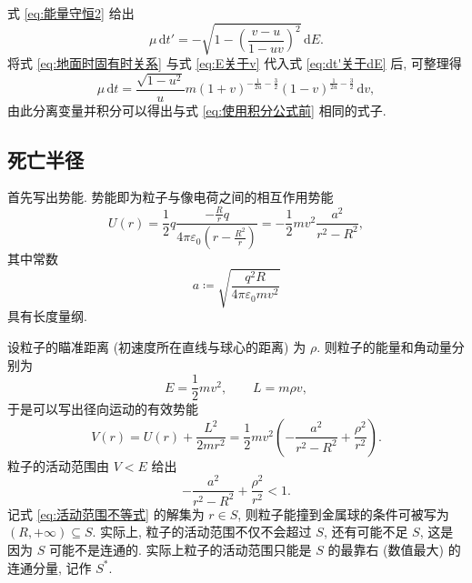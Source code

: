 \documentclass{article}
\begin{document}
式 \ref{eq:能量守恒2} 给出
\begin{equation}
	\label{eq:dt'关于dE}
	\mu\,\mathrm dt'=-\sqrt{1-\left(\frac{v-u}{1-uv}\right)^2}\,\mathrm dE.
\end{equation}
将式 \ref{eq:地面时固有时关系} 与式 \ref{eq:E关于v} 代入式 \ref{eq:dt'关于dE} 后, 可整理得
\begin{equation}
	\mu\,\mathrm dt=\frac{\sqrt{1-u^2}}um\left(1+v\right)^{-\frac1{2u}-\frac32}
	\left(1-v\right)^{\frac1{2u}-\frac32}\,\mathrm dv,
\end{equation}
由此分离变量并积分可以得出与式 \ref{eq:使用积分公式前} 相同的式子.

\subsection{死亡半径}

首先写出势能.
势能即为粒子与像电荷之间的相互作用势能
\begin{equation}
	U\!\left(r\right)=\frac12q\frac{-\frac Rrq}
	{4\pi\varepsilon_0\left(r-\frac{R^2}r\right)}
	=-\frac12mv^2\frac{a^2}{r^2-R^2},
\end{equation}
其中常数
\begin{equation}
	a\coloneqq \sqrt{\frac{q^2R}{4\pi\varepsilon_0mv^2}}
\end{equation}
具有长度量纲.

设粒子的瞄准距离 (初速度所在直线与球心的距离) 为 $\rho$.
则粒子的能量和角动量分别为
\begin{equation}
	E=\frac12mv^2,\qquad L=m\rho v,
\end{equation}
于是可以写出径向运动的有效势能
\begin{equation}
	V\!\left(r\right)=U\!\left(r\right)+\frac{L^2}{2mr^2}
	=\frac12mv^2\left(-\frac{a^2}{r^2-R^2}+\frac{\rho^2}{r^2}\right).
\end{equation}
粒子的活动范围由 $V<E$ 给出
\begin{equation}
	\label{eq:活动范围不等式}
	-\frac{a^2}{r^2-R^2}+\frac{\rho^2}{r^2}<1.
\end{equation}
记式 \ref{eq:活动范围不等式} 的解集为 $r\in S$, 则粒子能撞到金属球的条件可被写为
$\left(R,+\infty\right)\subseteq S$.
实际上, 粒子的活动范围不仅不会超过 $S$, 还有可能不足 $S$,
这是因为 $S$ 可能不是连通的.
实际上粒子的活动范围只能是 $S$ 的最靠右 (数值最大) 的连通分量, 记作 $S^*$.
\end{document}
